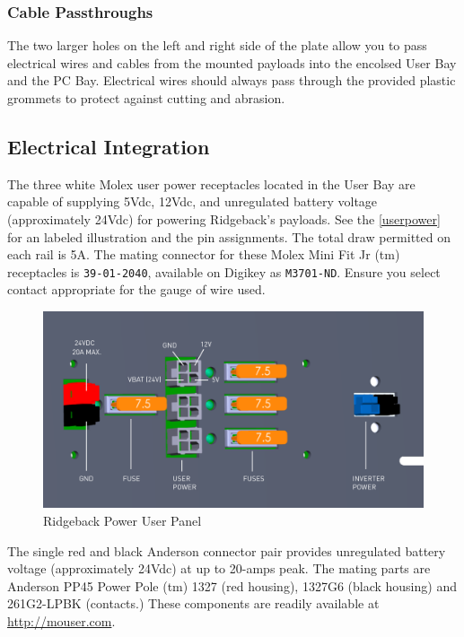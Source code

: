 \documentclass[]{clearpath-latex/clearpath-manual}
\begin{document}
\subsubsection{Cable Passthroughs}

The two larger holes on the left and right side of the plate allow you to pass electrical wires and cables from the mounted payloads into the encolsed User Bay and the PC Bay.  Electrical wires should always pass through the provided plastic grommets to protect against cutting and abrasion.

\pagebreak[4]
\subsection{Electrical Integration}
\label{electrical}

The three white Molex user power receptacles located in the User Bay are capable of supplying 5Vdc, 12Vdc, and unregulated battery voltage (approximately 24Vdc) for powering Ridgeback's payloads. See the \autoref{userpower} for an labeled illustration and the pin assignments. The total draw permitted on each rail is 5A. The mating connector for these Molex Mini Fit Jr (tm) receptacles is \lstinline{39-01-2040}, available on Digikey as \lstinline{M3701-ND}. Ensure you select contact appropriate for the gauge of wire used.

\begin{figure}[h]
  \centering
  \includegraphics[width=1.0\linewidth]{Ridgeback_UserPower_SOLID.pdf}
  \caption{Ridgeback Power User Panel}
  \label{userpower}
\end{figure}

The single red and black Anderson connector pair provides unregulated battery voltage (approximately 24Vdc) at up to 20-amps peak. The mating parts are Anderson PP45 Power Pole (tm) 1327 (red housing), 1327G6 (black housing) and 261G2-LPBK (contacts.) These components are readily available at \url{http://mouser.com}.
\end{document}
